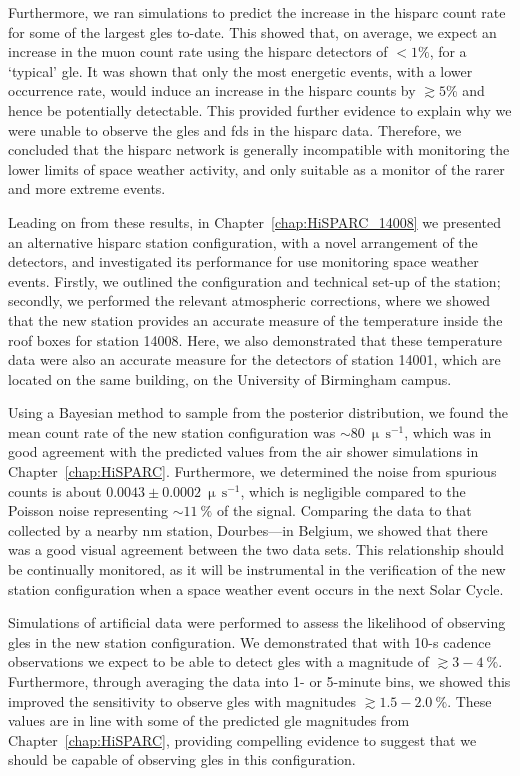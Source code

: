 Furthermore, we ran simulations to predict the increase in the \gls{hisparc} count rate for some of the largest \glspl{gle} to-date. This showed that, on average, we expect an increase in the muon count rate using the \gls{hisparc} detectors of $<1\%$, for a `typical' \gls{gle}. It was shown that only the most energetic events, with a lower occurrence rate, would induce an increase in the \gls{hisparc} counts by $\gtrsim5\%$ and hence be potentially detectable. This provided further evidence to explain why we were unable to observe the \glspl{gle} and \glspl{fd} in the \gls{hisparc} data. Therefore, we concluded that the \gls{hisparc} network is generally incompatible with monitoring the lower limits of space weather activity, and only suitable as a monitor of the rarer and more extreme events.


Leading on from these results, in Chapter~\ref{chap:HiSPARC_14008} we presented an alternative \gls{hisparc} station configuration, with a novel arrangement of the detectors, and investigated its performance for use monitoring space weather events. Firstly, we outlined the configuration and technical set-up of the station; secondly, we performed the relevant atmospheric corrections, where we showed that the new station provides an accurate measure of the temperature inside the roof boxes for station 14008. Here, we also demonstrated that these temperature data were also an accurate measure for the detectors of station 14001, which are located on the same building, on the University of Birmingham campus.

Using a Bayesian method to sample from the posterior distribution, we found the mean count rate of the new station configuration was $\sim$$80~\upmu \, \mathrm{s}^{-1}$, which was in good agreement with the predicted values from the air shower simulations in Chapter~\ref{chap:HiSPARC}. Furthermore, we determined the noise from spurious counts is about $0.0043\pm0.0002~\upmu \, \mathrm{s}^{-1}$, which is negligible compared to the Poisson noise representing $\sim$$11~\%$ of the signal. Comparing the data to that collected by a nearby \gls{nm} station, Dourbes---in Belgium, we showed that there was a good visual agreement between the two data sets. This relationship should be continually monitored, as it will be instrumental in the verification of the new station configuration when a space weather event occurs in the next Solar Cycle.

Simulations of artificial data were performed to assess the likelihood of observing \glspl{gle} in the new station configuration. We demonstrated that with 10-s cadence observations we expect to be able to detect \glspl{gle} with a magnitude of $\gtrsim3-4~\%$. Furthermore, through averaging the data into 1- or 5-minute bins, we showed this improved the sensitivity to observe \glspl{gle} with magnitudes $\gtrsim1.5-2.0~\%$. These values are in line with some of the predicted \gls{gle} magnitudes from Chapter~\ref{chap:HiSPARC}, providing compelling evidence to suggest that we should be capable of observing \glspl{gle} in this configuration.

